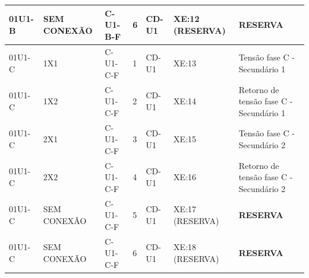\documentclass[11pt,a4paper]{article}
\newcommand{\res}{\textbf{RESERVA}}
\begin{document}
\begin{landscape}
\begin{longtable}{@{}L{2.5cm}L{2.4cm}L{2.8cm}L{0.85cm}L{2.4cm}L{2.6cm}L{9.5cm}@{}}
01U1-B & SEM CONEXÃO & C-U1-B-F & 6 & CD-U1 & XE:12 (RESERVA) & \res{}\\
\midrule
01U1-C & 1X1 & C-U1-C-F & 1 & CD-U1 & XE:13 & Tensão fase C - Secundário 1\\
01U1-C & 1X2 & C-U1-C-F & 2 & CD-U1 & XE:14 & Retorno de tensão fase C - Secundário 1\\
01U1-C & 2X1 & C-U1-C-F & 3 & CD-U1 & XE:15 & Tensão fase C - Secundário 2\\
01U1-C & 2X2 & C-U1-C-F & 4 & CD-U1 & XE:16 & Retorno de tensão fase C - Secundário 2\\
01U1-C & SEM CONEXÃO & C-U1-C-F & 5 & CD-U1 & XE:17 (RESERVA) & \res{}\\
01U1-C & SEM CONEXÃO & C-U1-C-F & 6 & CD-U1 & XE:18 (RESERVA) & \res{}\\
\end{longtable}\endgroup\end{landscape}
\end{document}
